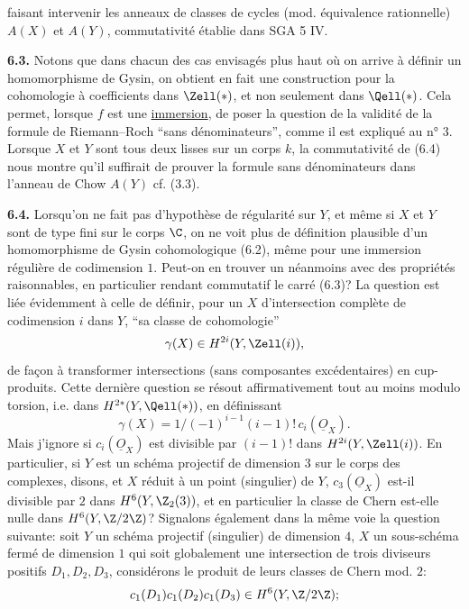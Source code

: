 
faisant intervenir les anneaux de classes de cycles (mod. équivalence rationnelle) $A(X)$ et $A(Y)$, commutativité établie dans SGA 5 IV.

\textbf{6.3.} Notons que dans chacun des cas envisagés plus haut où on arrive à définir un homomorphisme de Gysin, on obtient en fait une construction pour la cohomologie à coefficients dans $\Zell(*)$, et non seulement dans $\Qell(*)$. Cela permet, lorsque $f$ est une \uline{immersion}, de poser la question de la validité de la formule de Riemann--Roch ``sans dénominateurs'', comme il est expliqué au n° 3. Lorsque $X$ et $Y$ sont tous deux lisses sur un corps $k$, la commutativité de (6.4) nous montre qu'il suffirait de prouver la formule sans dénominateurs dans l'anneau de Chow $A(Y)$ cf. (3.3).

\textbf{6.4.} Lorsqu'on ne fait pas d'hypothèse de régularité sur $Y$, et même si $X$ et $Y$ sont de type fini sur le corps $\C$, on ne voit plus de définition plausible d'un homomorphisme de Gysin cohomologique (6.2), même pour une immersion régulière de codimension $1$. Peut-on en trouver un néanmoins avec des propriétés raisonnables, en particulier rendant commutatif le carré (6.3)? La question est liée évidemment à celle de définir, pour un $X$ d'intersection complète de codimension $i$ dans $Y$, ``sa classe de cohomologie''
\[
 \gamma(X)\in H^{2i}(Y,\Zell(i)),
\]
de façon à transformer intersections (sans composantes excédentaires) en cup-produits. Cette dernière question se résout affirmativement tout au moins modulo torsion, i.e. dans $H^{2*}(Y,\Qell(*))$, en définissant
\[
 \gamma(X)=1/(-1)^{i-1}(i-1)!\,c_i(\underline{O}_X).
\]
Mais j'ignore si $c_i(\underline{O}_X)$ est divisible par $(i-1)!$ dans $H^{2i}(Y,\Zell(i))$. En particulier, si $Y$ est un schéma projectif de dimension $3$ sur le corps des complexes, disons, et $X$ réduit à un point (singulier) de $Y$, $c_3(\underline{O}_X)$ est-il divisible par $2$ dans $H^6(Y,\Z_2(3))$, et en particulier la classe de Chern est-elle nulle dans $H^6(Y,\Z/2\Z)$? Signalons également dans la même voie la question suivante: soit $Y$ un schéma projectif (singulier) de dimension $4$, $X$ un sous-schéma fermé de dimension $1$ qui soit globalement une intersection de trois diviseurs positifs $D_1,D_2,D_3$, considérons le produit de leurs classes de Chern mod. $2$:
\[
 c_1(D_1)c_1(D_2)c_1(D_3)\in H^6(Y,\Z/2\Z);
\]
